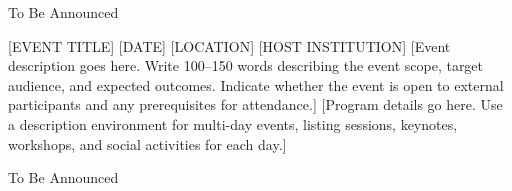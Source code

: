 \begin{tcolorbox}[colback=mscaLightGrey, colframe=mscaGrey, arc=2mm]
\centering\sffamily\large\color{mscaGrey}
To Be Announced
\end{tcolorbox}

\newpage
\eventpage
  {[EVENT TITLE]}%
  {[DATE]}%
  {[LOCATION]}%
  {[HOST INSTITUTION]}%
  {[Event description goes here.  Write 100--150 words describing the event
    scope, target audience, and expected outcomes.  Indicate whether the event
    is open to external participants and any prerequisites for attendance.]}%
  {[Program details go here.  Use a description environment for multi-day
    events, listing sessions, keynotes, workshops, and social activities for
    each day.]}%
  {}%

\begin{tcolorbox}[colback=mscaLightGrey, colframe=mscaGrey, arc=2mm]
\centering\sffamily\large\color{mscaGrey}
To Be Announced
\end{tcolorbox}
